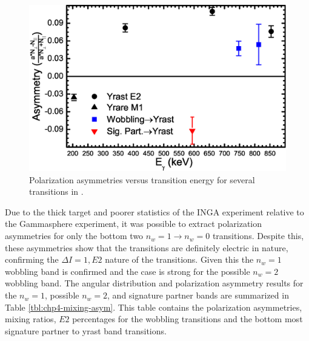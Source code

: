 \begin{figure}[t!]
\centerline{\includegraphics[width=\textwidth]{./img/c4/AsymPlot.eps}}
	\caption{Polarization asymmetries versus transition energy for several transitions in \pr{}.\label{fig:chp4-asyms}}
\end{figure}

Due to the thick target and poorer statistics of the INGA experiment relative to the Gammasphere experiment, it was possible to extract polarization asymmetries for only the bottom two $n_w=1\rightarrow{}n_w=0$ transitions. Despite this, these asymmetries show that the transitions are definitely electric in nature, confirming the $\Delta{}I=1, E2$ nature of the transitions. Given this the $n_w=1$ wobbling band is confirmed and the case is strong for the possible $n_w=2$ wobbling band. The angular distribution and polarization asymmetry results for the $n_w=1$, possible $n_w=2$, and signature partner bands are summarized in Table \ref{tbl:chp4-mixing-asym}. This table contains the polarization asymmetries, mixing ratios, $E2$ percentages for the wobbling transitions and the bottom most signature partner to yrast band transitions. 


